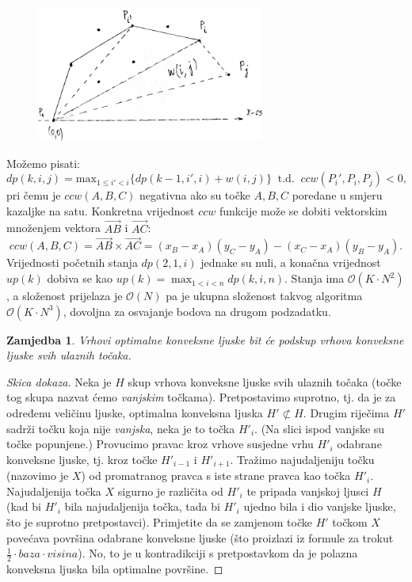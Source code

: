 \begin{figure}[h]
  \centering
  \includegraphics[height=4.5cm]{pic/img1.png}
\end{figure}

Možemo pisati:
\begin{equation*}
  dp(k,i,j) = \text{max}_{1 \le i' < i} \{ dp(k-1,i',i) + w(i, j)\}
  \ \text{ t.d. }\
  ccw(P_i', P_i, P_j) < 0,
\end{equation*}
pri čemu je $ccw(A, B, C)$ negativna ako su točke $A, B, C$ poredane u smjeru
kazaljke na satu. Konkretna vrijednost $ccw$ funkcije može se dobiti vektorskim
množenjem vektora $\overrightarrow{AB}$ i $\overrightarrow{AC}$:
\begin{equation*}
  ccw(A, B, C) = \overrightarrow{AB} \times \overrightarrow{AC} =
    (x_B - x_A)(y_C - y_A) - (x_C - x_A)(y_B - y_A).
\end{equation*}
Vrijednosti početnih stanja $dp(2,1,i)$ jednake su nuli, a konačna vrijednost
$up(k)$ dobiva se kao $up(k) = \max_{1 < i < n} dp(k,i,n)$. Stanja ima
$\mathcal{O}(K \cdot N^2)$, a složenost prijelaza je $\mathcal{O}(N)$ pa
je ukupna složenost takvog algoritma $\mathcal{O}(K \cdot N^3)$, dovoljna
za osvajanje bodova na drugom podzadatku.

\newtheorem{zamjedba}{Zamjedba}

\begin{zamjedba}
Vrhovi optimalne konveksne ljuske bit će podskup vrhova konveksne ljuske svih ulaznih
točaka.
\end{zamjedba}

\begin{proof}[Skica dokaza]
  Neka je $H$ skup vrhova konveksne ljuske svih ulaznih točaka (točke
  tog skupa nazvat ćemo \textit{vanjskim} točkama). Pretpostavimo suprotno, tj.
  da je za određenu veličinu ljuske, optimalna konveksna ljuska $H' \not\subset H$. Drugim riječima $H'$ sadrži
  točku koja nije \textit{vanjska}, neka je to točka $H'_i$. (Na slici ispod vanjske
  su točke popunjene.) Provucimo pravac kroz vrhove susjedne vrhu
  $H'_i$ odabrane konveksne ljuske, tj. kroz točke $H'_{i-1}$ i $H'_{i+1}$.
  Tražimo najudaljeniju točku (nazovimo je $X$) od promatranog pravca s iste strane
  pravca kao točka $H'_i$. Najudaljenija točka $X$ sigurno je različita od $H'_i$ te
  pripada vanjskoj ljusci $H$ (kad bi $H'_i$ bila najudaljenija točka, tada bi $H'_i$
  ujedno bila i dio vanjske ljuske, što je suprotno pretpostavci). Primjetite da
  se zamjenom točke $H'$ točkom $X$ povećava površina odabrane konveksne ljuske
  (što proizlazi iz formule za trokut $\frac{1}{2} \cdot baza \cdot visina$).
  No, to je u kontradikciji s pretpostavkom da je polazna konveksna ljuska bila
  optimalne površine.
\end{proof}


